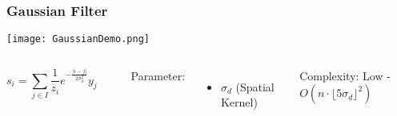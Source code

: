 \documentclass{beamer}
\begin{document}
\begin{frame}
\begin{center}
\frametitle{Gaussian Filter}

\texttt{[image: GaussianDemo.png]}

\begin{columns}[c]

\column{2.5 in}
\centering

\begin{displaymath}
s_i = \sum _{j \in I} \frac{1}{z_i} e^{-\frac{\lvert i - j \rvert}{2 \sigma_d^2}} y_j
\end{displaymath}

$ $\\

\column{2.5 in}
\justifying

Parameter:

\begin{itemize}

\item $\sigma_d$ (Spatial Kernel)

\end{itemize}

Complexity: Low - $O \left( n \cdot \lfloor 5 \sigma_d \rfloor ^2 \right)$

\end{columns}

\end{center}
\end{frame}

\end{document}
